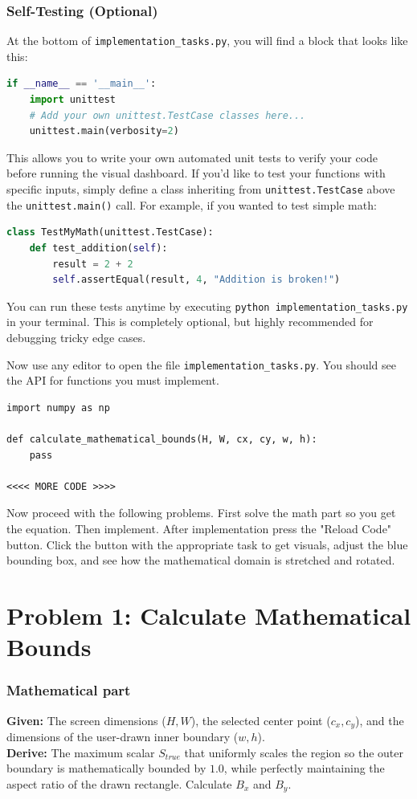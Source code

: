 \documentclass[11pt]{article}
\begin{document}
\subsubsection*{Self-Testing (Optional)}
At the bottom of \lstinline|implementation_tasks.py|, you will find a block that looks like this:
\begin{lstlisting}[language=Python]
if __name__ == '__main__':
    import unittest
    # Add your own unittest.TestCase classes here...
    unittest.main(verbosity=2)
\end{lstlisting}
This allows you to write your own automated unit tests to verify your code before running the visual dashboard. If you'd like to test your functions with specific inputs, simply define a class inheriting from \lstinline|unittest.TestCase| above the \lstinline|unittest.main()| call. For example, if you wanted to test simple math:
\begin{lstlisting}[language=Python]
class TestMyMath(unittest.TestCase):
    def test_addition(self):
        result = 2 + 2
        self.assertEqual(result, 4, "Addition is broken!")
\end{lstlisting}
You can run these tests anytime by executing \lstinline|python implementation_tasks.py| in your terminal. This is completely optional, but highly recommended for debugging tricky edge cases.

Now use any editor to open the file \lstinline|implementation_tasks.py|. You should see the API for functions you must implement.

\begin{lstlisting}
import numpy as np

def calculate_mathematical_bounds(H, W, cx, cy, w, h):
    pass

<<<< MORE CODE >>>>
\end{lstlisting}

Now proceed with the following problems. First solve the math part so you get the equation. Then implement. After implementation press the "Reload Code" button. Click the button with the appropriate task to get visuals, adjust the blue bounding box, and see how the mathematical domain is stretched and rotated.

\section*{Problem 1: Calculate Mathematical Bounds}

\subsubsection*{Mathematical part}
\textbf{Given:} The screen dimensions ($H, W$), the selected center point ($c_x, c_y$), and the dimensions of the user-drawn inner boundary ($w, h$). \\
\textbf{Derive:} The maximum scalar $S_{true}$ that uniformly scales the region so the outer boundary is mathematically bounded by $1.0$, while perfectly maintaining the aspect ratio of the drawn rectangle. Calculate $B_x$ and $B_y$.
\end{document}
